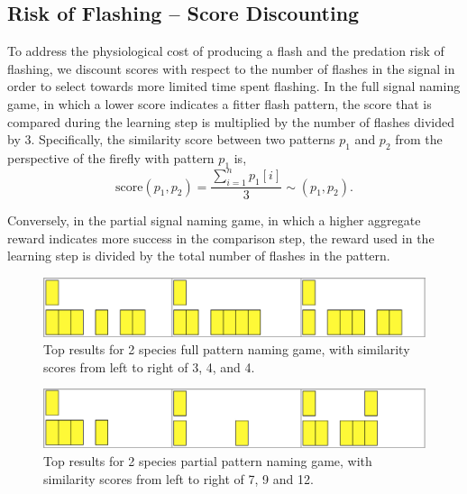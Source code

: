 \subsection{Risk of Flashing -- Score Discounting}
To address the physiological cost of producing a flash and the predation risk of flashing, we discount scores with respect to the number of flashes in the signal in order to select towards more limited time spent flashing. 
In the full signal naming game, in which a lower score indicates a fitter flash pattern, the score that is compared during the learning step is multiplied by the number of flashes divided by 3. Specifically, the similarity score between two patterns $p_1$ and $p_2$ from the perspective of the firefly with pattern $p_1$ is, \[ \textrm{score}(p_1, p_2) = \frac{\sum_{i = 1}^{n} p_1[i]}{3} \sim(p_1, p_2).\]

Conversely, in the partial signal naming game, in which a higher aggregate reward indicates more success in the comparison step, the reward used in the learning step is divided by the total number of flashes in the pattern. 


\begin{figure}[h]
\includegraphics[width = \columnwidth]{./pictures/2_lcs_one/all.png}
\caption{Top results for 2 species full pattern naming game, with similarity scores from left to right of 3, 4, and 4.}
\end{figure} 

\begin{figure}[h]
\includegraphics[width = \columnwidth]{./pictures/2_lcs_two/all.png}
\caption{Top results for 2 species partial pattern naming game, with similarity scores from left to right of 7, 9 and 12.}
\end{figure} 

